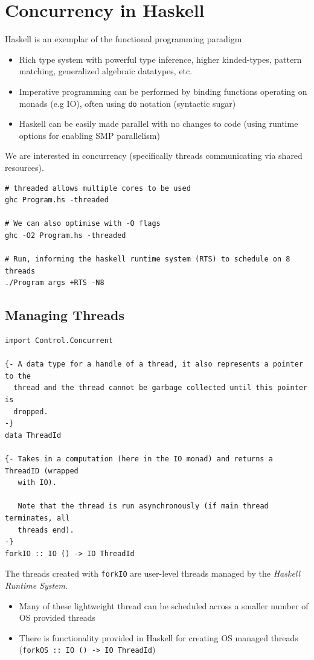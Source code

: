 \chapter{Concurrency in Haskell}
Haskell is an exemplar of the functional programming paradigm
\begin{itemize}
	\item Rich type system with powerful type inference, higher kinded-types, pattern matching, generalized algebraic datatypes, etc.
	\item Imperative programming can be performed by binding functions operating on monads (e.g IO), often using \texttt{do} notation (syntactic sugar)
	\item Haskell can be easily made parallel with no changes to code (using runtime options for enabling SMP parallelism)
\end{itemize}
We are interested in concurrency (specifically threads communicating via shared resources).
\begin{verbatim}
# threaded allows multiple cores to be used
ghc Program.hs -threaded

# We can also optimise with -O flags 
ghc -O2 Program.hs -threaded

# Run, informing the haskell runtime system (RTS) to schedule on 8 threads
./Program args +RTS -N8
\end{verbatim}

\section{Managing Threads}
\begin{verbatim}
import Control.Concurrent

{- A data type for a handle of a thread, it also represents a pointer to the 
  thread and the thread cannot be garbage collected until this pointer is 
  dropped. 
-}
data ThreadId

{- Takes in a computation (here in the IO monad) and returns a ThreadID (wrapped 
   with IO).

   Note that the thread is run asynchronously (if main thread terminates, all 
   threads end).
-}
forkIO :: IO () -> IO ThreadId
\end{verbatim}
The threads created with \texttt{forkIO} are user-level threads managed by the \textit{Haskell Runtime System}.
\begin{itemize}
	\item Many of these lightweight thread can be scheduled across a smaller number of OS provided threads
	\item There is functionality provided in Haskell for creating OS managed threads (\texttt{forkOS :: IO () -> IO ThreadId})
\end{itemize}

